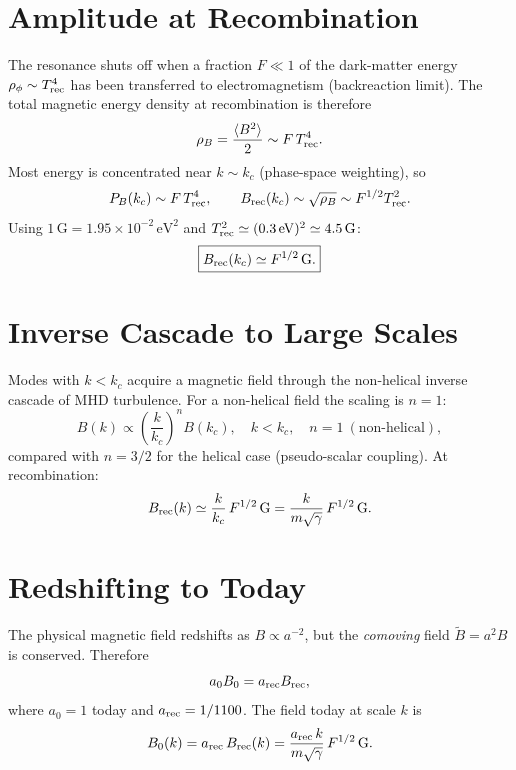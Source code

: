 \documentclass[12pt,a4paper,openany]{book}
\newcommand{\kc}{k_c}
\begin{document}
\section{Amplitude at Recombination}

The resonance shuts off when a fraction $F \ll 1$ of the dark-matter energy $\rho_\phi \sim T_{\rm rec}^4$ has been transferred to electromagnetism (backreaction limit). The total magnetic energy density at recombination is therefore
\begin{equation}
  \rho_B = \frac{\langle B^2\rangle}{2} \sim F\,T_{\rm rec}^4.
\end{equation}
Most energy is concentrated near $k \sim \kc$ (phase-space weighting), so
\begin{equation}
  P_B(\kc) \sim F\,T_{\rm rec}^4, \qquad B_{\rm rec}(\kc) \sim \sqrt{\rho_B} \sim F^{1/2}T_{\rm rec}^2.
\end{equation}
Using $1\,\mathrm{G} = 1.95\times10^{-2}\,\mathrm{eV}^2$ and $T_{\rm rec}^2 \simeq (0.3\,\mathrm{eV})^2 \simeq 4.5\,\mathrm{G}$:
\begin{equation}
  \boxed{B_{\rm rec}(\kc) \simeq F^{1/2}\,\mathrm{G}.}
\end{equation}

\section{Inverse Cascade to Large Scales}

Modes with $k < \kc$ acquire a magnetic field through the non-helical inverse cascade of MHD turbulence. For a non-helical field the scaling is $n=1$:
\begin{equation}
  B(k) \propto \left(\frac{k}{\kc}\right)^n B(\kc), \quad k < \kc, \quad n = 1 \ (\text{non-helical}),
\end{equation}
compared with $n = 3/2$ for the helical case (pseudo-scalar coupling). At recombination:
\begin{equation}
  B_{\rm rec}(k) \simeq \frac{k}{\kc}\,F^{1/2}\,\mathrm{G} = \frac{k}{m\sqrt{\gamma}}\,F^{1/2}\,\mathrm{G}.
\end{equation}

\section{Redshifting to Today}

The physical magnetic field redshifts as $B \propto a^{-2}$, but the \emph{comoving} field $\tilde{B} = a^2 B$ is conserved. Therefore
\begin{equation}
  a_0 B_0 = a_{\rm rec} B_{\rm rec},
\end{equation}
where $a_0 = 1$ today and $a_{\rm rec} = 1/1100$. The field today at scale $k$ is
\begin{equation}
  B_0(k) = a_{\rm rec}\,B_{\rm rec}(k) = \frac{a_{\rm rec}\,k}{m\sqrt{\gamma}}\,F^{1/2}\,\mathrm{G}.
  \label{eq:B0k}
\end{equation}
\end{document}
